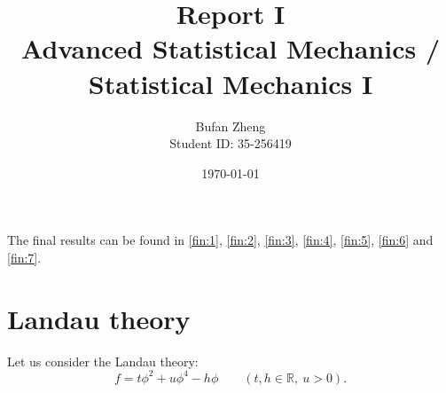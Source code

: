 \documentclass[11pt,a4paper]{article}
\title{\textbf{Report I}\\[0.4em]
	\large Advanced Statistical Mechanics / Statistical Mechanics I}
\author{Bufan Zheng\\[0.2em]\normalsize Student ID: 35-256419}
\date{\today}
\begin{document}
	
	\maketitle
	
	The final results can be found in \eqref{fin:1}, \eqref{fin:2}, \eqref{fin:3}, \eqref{fin:4}, \eqref{fin:5}, \eqref{fin:6} and \eqref{fin:7}.
	
	\section*{Landau theory}
	
	Let us consider the Landau theory:
	\begin{equation}
		\label{eq:1}
		f = t\phi^2 + u\phi^4 - h\phi
		\qquad
		(t,h \in \mathbb{R},\ u > 0).
		\tag{1}
	\end{equation}
	
\end{document}

